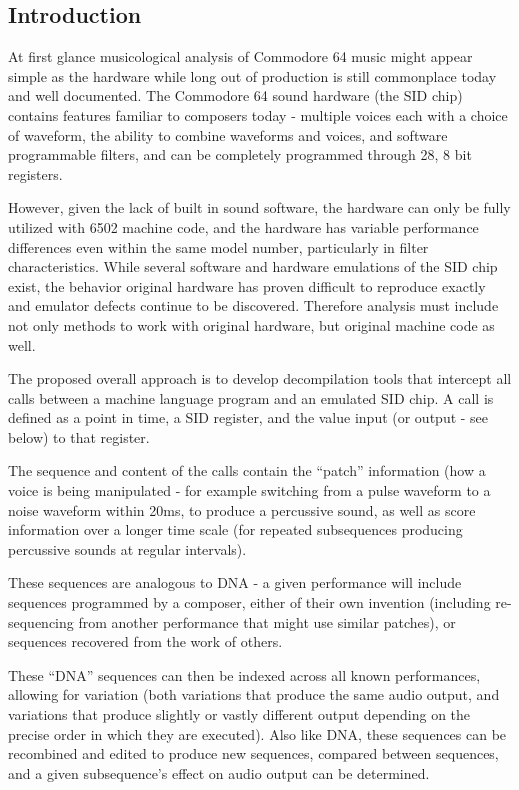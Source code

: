\documentclass[10pt]{article}
\begin{document}
        \vspace{5mm}

\begin{multicols*}{2}

  \section{Introduction}

  At first glance musicological analysis of Commodore 64 music might
  appear simple as the hardware while long out of production is still
  commonplace today and well documented. The Commodore 64 sound
  hardware (the SID chip) contains features familiar to composers
  today - multiple voices each with a choice of waveform, the ability
  to combine waveforms and voices, and software programmable filters,
  and can be completely programmed through 28, 8 bit registers.

  However, given the lack of built in sound software, the hardware can
  only be fully utilized with 6502 machine code, and the hardware has
  variable performance differences even within the same model number,
  particularly in filter characteristics. While several software and
  hardware emulations of the SID chip exist, the behavior original
  hardware has proven difficult to reproduce exactly and emulator
  defects continue to be discovered.  Therefore analysis must include
  not only methods to work with original hardware, but original
  machine code as well.

  The proposed overall approach is to develop decompilation tools
  that intercept all calls between a machine language program and an
  emulated SID chip. A call is defined as a point in time, a SID
  register, and the value input (or output - see below) to that
  register.

  The sequence and content of the calls contain the ``patch''
  information (how a voice is being manipulated - for example
  switching from a pulse waveform to a noise waveform within 20ms, to
  produce a percussive sound, as well as score information over a
  longer time scale (for repeated subsequences producing percussive
  sounds at regular intervals).

  These sequences are analogous to DNA - a given performance will
  include sequences programmed by a composer, either of their own
  invention (including re-sequencing from another performance that
  might use similar patches), or sequences recovered from the work of
  others.

  These ``DNA'' sequences can then be indexed across all known
  performances, allowing for variation (both variations that produce
  the same audio output, and variations that produce slightly or
  vastly different output depending on the precise order in which they
  are executed). Also like DNA, these sequences can be recombined and
  edited to produce new sequences, compared between sequences, and a
  given subsequence's effect on audio output can be determined.


\end{multicols*}
\end{document}
